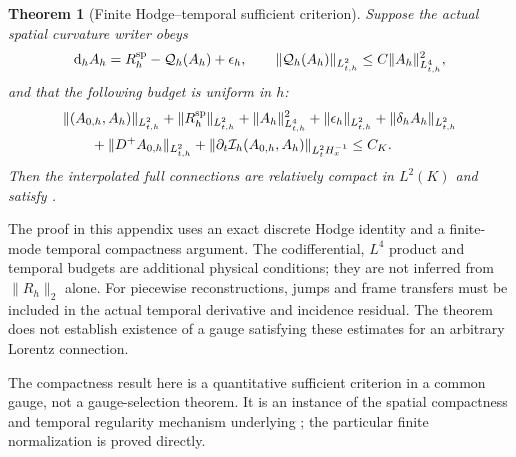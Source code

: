 \documentclass[11pt]{article}
\newtheorem{theorem}{Theorem}[section]
\numberwithin{equation}{section}
\theoremstyle{definition}
\theoremstyle{remark}
\newcommand{\dd}{\mathrm d}
\begin{document}
\begin{theorem}[Finite Hodge--temporal sufficient criterion]
\label{thm:main-hodge-connection}
Suppose the actual spatial curvature writer obeys
\begin{equation}
 \dd_hA_h=R_h^{\rm sp}-\mathcal Q_h(A_h)+\epsilon_h,
 \qquad
 \|\mathcal Q_h(A_h)\|_{L^2_{t,h}}
       \le C\|A_h\|_{L^4_{t,h}}^2,
 \label{eq:main-connection-hodge-incidence}
\end{equation}
and that the following budget is uniform in $h$:
\begin{equation}
 \begin{split}
 &\|(A_{0,h},A_h)\|_{L^2_{t,h}}
 +\|R_h^{\rm sp}\|_{L^2_{t,h}}+\|A_h\|_{L^4_{t,h}}^2
 +\|\epsilon_h\|_{L^2_{t,h}}+\|\delta_hA_h\|_{L^2_{t,h}}\\
 &\qquad
 +\|D^+A_{0,h}\|_{L^2_{t,h}}
 +\|\partial_t\mathcal I_h(A_{0,h},A_h)\|_{L^2_tH^{-1}_x}
 \le C_K.
 \end{split}
 \label{eq:main-connection-hodge-budget}
\end{equation}
Then the interpolated full connections are relatively compact in
$L^2(K)$ and satisfy .
\end{theorem}

The proof in this appendix uses an exact discrete Hodge
identity and a finite-mode temporal compactness argument. The codifferential,
$L^4$ product and temporal budgets are additional physical conditions; they
are not inferred from $\|R_h\|_2$ alone. For piecewise reconstructions, jumps
and frame transfers must be included in the actual temporal derivative and
incidence residual. The theorem does not establish existence of a gauge
satisfying these estimates for an arbitrary Lorentz connection.


The compactness result here is a quantitative sufficient criterion in a
common gauge, not a gauge-selection theorem. It is an instance of the
spatial compactness and temporal regularity mechanism underlying
\cite{SimonCompact}; the particular finite normalization is proved directly.
\end{document}
